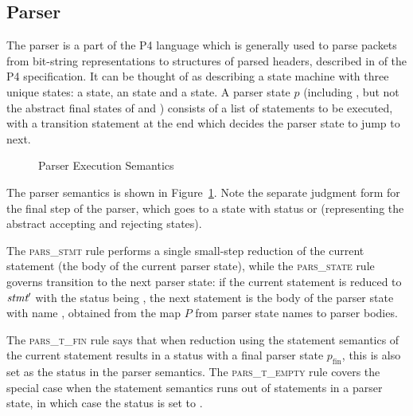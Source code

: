 \documentclass[UTF8]{article}
\begin{document}
\subsection{Parser}
The parser is a part of the P4 language which is generally used to parse packets from bit-string representations to structures of parsed headers, described in  of the P4 specification. It can be thought of as describing a state machine with three unique states: a \start{} state, an \accept{} state and a \reject{\msg{}} state. A parser state $p$ (including \start{}, but not the abstract final states of \accept{} and \reject{\msg{}}) consists of a list of statements to be executed, with a transition statement at the end which decides the parser state to jump to next.
\begin{figure}[ht!]
\ottdefnsparsXXsem
\ottdefnsparsXXtXXsem
\caption{Parser Execution Semantics}
\label{fig:semparsexec}
\end{figure}

The parser semantics is shown in Figure~\ref{fig:semparsexec}. Note the separate judgment form for the final step of the parser, which goes to a state with status \accept{} or \reject{} (representing the abstract accepting and rejecting states).

The \textsc{pars\_stmt} rule performs a single small-step reduction of the current statement (the body of the current parser state), while the \textsc{pars\_state} rule governs transition to the next parser state: if the current statement \stmt{} is reduced to $\textit{stmt}{}'$ with the status being \trans{\vn{}}, the next statement is the body of the parser state with name \vn{}, obtained from the map $P$ from parser state names to parser bodies.

The \textsc{pars\_t\_fin} rule says that when reduction using the statement semantics of the current statement results in a status with a final parser state $p_{\mathrm{fin}}$, this is also set as the status in the parser semantics. The \textsc{pars\_t\_empty} rule covers the special case when the statement semantics runs out of statements in a parser state, in which case the status is set to .
\end{document}
